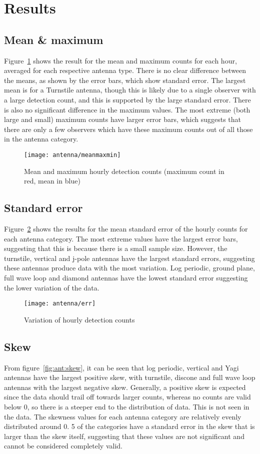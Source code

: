 \section{Results}
\subsection{Mean \& maximum}
Figure~\ref{fig:ant:meanmaxmin} shows the result for the mean and maximum counts for each hour, averaged for each respective antenna type. There is no clear difference between the means, as shown by the error bars, which show standard error. The largest mean is for a Turnstile antenna, though this is likely due to a single observer with a large detection count, and this is supported by the large standard error. There is also no significant difference in the maximum values. The most extreme (both large and small) maximum counts have larger error bars, which suggests that there are only a few observers which have these maximum counts out of all those in the antenna category.

\begin{figure}[h!]
	\centering
	\texttt{[image: antenna/meanmaxmin]}
	\caption{Mean and maximum hourly detection counts (maximum count in red, mean in blue)
		\label{fig:ant:meanmaxmin}}
\end{figure}

\subsection{Standard error}
Figure~\ref{fig:ant:err} shows the results for the mean standard error of the hourly counts for each antenna category. The most extreme values have the largest error bars, suggesting that this is because there is a small sample size. However, the turnstile, vertical and j-pole antennas have the largest standard errors, suggesting these antennas produce data with the most variation. Log periodic, ground plane, full wave loop and diamond antennas have the 
lowest standard error suggesting the lower variation of the data.

\begin{figure}[h!]
	\centering
	\texttt{[image: antenna/err]}
	\caption{Variation of hourly detection counts
		\label{fig:ant:err}}
\end{figure}

\subsection{Skew}
From figure~\ref{fig:ant:skew}, it can be seen that log periodic, vertical and Yagi antennas have the largest positive skew, with turnstile, discone and full wave loop antennas with the largest negative skew. Generally, a positive skew is expected since the data should trail off towards larger counts, whereas no counts are valid below 0, so there is a steeper end to the distribution of data. This is not seen in the data. The skewness values for each antenna category are relatively evenly distributed around 0. 5 of the categories have a standard error in the skew that is larger than the skew itself, suggesting that these values are not significant and cannot be considered completely valid.

